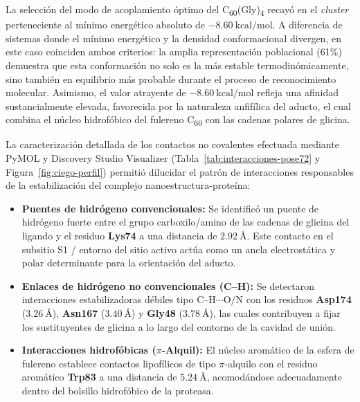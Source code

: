 La selección del modo de acoplamiento óptimo del C\textsubscript{60}(Gly)\textsubscript{4} recayó en el \textit{cluster} perteneciente al mínimo energético absoluto de $-8.60\ \text{kcal/mol}$. A diferencia de sistemas donde el mínimo energético y la densidad conformacional divergen, en este caso coinciden ambos criterios: la amplia representación poblacional (61\%) demuestra que esta conformación no solo es la más estable termodinómicamente, sino también  en equilibrio más probable durante el proceso de reconocimiento molecular. Asimismo, el valor atrayente de $-8.60\ \text{kcal/mol}$ refleja una afinidad sustancialmente elevada, favorecida por la naturaleza anfifílica del aducto, el cual combina el núcleo hidrofóbico del fulereno C\textsubscript{60} con las cadenas polares de glicina.

La caracterización detallada de los contactos no covalentes efectuada mediante PyMOL y Discovery Studio Visualizer (Tabla~\ref{tab:interacciones-pose72} y Figura~\ref{fig:ciego-perfil}) permitió dilucidar el patrón de interacciones responsables de la estabilización del complejo nanoestructura-proteína:

\begin{itemize}
    \item \textbf{Puentes de hidrógeno convencionales:} Se identificó un puente de hidrógeno fuerte entre el grupo carboxilo/amino de las cadenas de glicina del ligando y el residuo \textbf{Lys74} a una distancia de $2.92\ \text{\AA}$. Este contacto en el subsitio S1 / entorno del sitio activo actúa como un ancla electrostática y polar determinante para la orientación del aducto.
    \item \textbf{Enlaces de hidrógeno no convencionales (C--H):} Se detectaron interacciones estabilizadoras débiles tipo $\text{C--H}\cdots\text{O/N}$ con los residuos \textbf{Asp174} ($3.26\ \text{\AA}$), \textbf{Asn167} ($3.40\ \text{\AA}$) y \textbf{Gly48} ($3.78\ \text{\AA}$), las cuales contribuyen a fijar los sustituyentes de glicina a lo largo del contorno de la cavidad de unión.
    \item \textbf{Interacciones hidrofóbicas ($\pi$-Alquil):} El núcleo aromático de la esfera de fulereno establece contactos lipofílicos de tipo $\pi$-alquilo con el residuo aromático \textbf{Trp83} a una distancia de $5.24\ \text{\AA}$, acomodándose adecuadamente dentro del bolsillo hidrofóbico de la proteasa.
\end{itemize}

